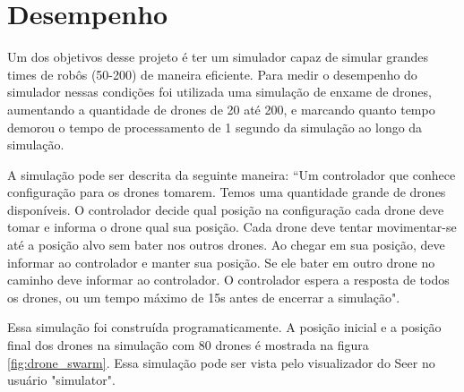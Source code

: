 \section{Desempenho}
\label{sec:performance}

Um dos objetivos desse projeto é ter um simulador capaz de simular grandes times de robôs (50-200) de maneira eficiente. Para medir o desempenho do simulador nessas condições foi utilizada uma simulação de enxame de drones, aumentando a quantidade de drones de 20 até 200, e marcando quanto tempo demorou o tempo de processamento de 1 segundo da simulação ao longo da simulação. 

A simulação pode ser descrita da seguinte maneira: “Um controlador que conhece configuração para os drones tomarem. Temos uma quantidade grande de drones disponíveis. O controlador decide qual posição na configuração cada drone deve tomar e informa o drone qual sua posição. Cada drone deve tentar movimentar-se até a posição alvo sem bater nos outros drones. Ao chegar em sua posição, deve informar ao controlador e manter sua posição. Se ele bater em outro drone no caminho deve informar ao controlador. O controlador espera a resposta de todos os drones, ou um tempo máximo de 15s antes de encerrar a simulação".

Essa simulação foi construída programaticamente. A posição inicial e a posição final dos drones na simulação com 80 drones é mostrada na figura \ref{fig:drone_swarm}. Essa simulação pode ser vista pelo visualizador do Seer no usuário "simulator".

